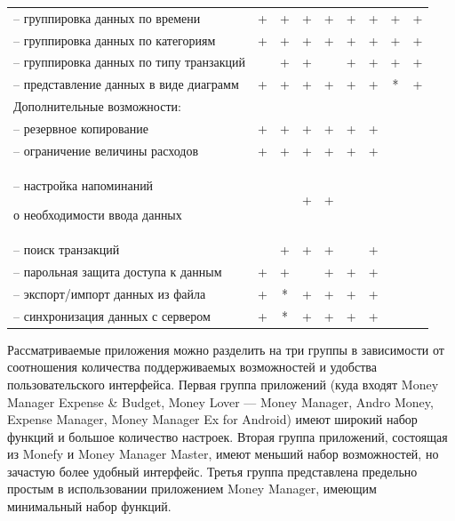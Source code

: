 \begin{table} [h]
{\begin{tabular}{| m{8cm} | c | c | c | c | c | c | c | c |}
      -- группировка данных по времени
      & +
      & +
      & +
      & +
      & +
      & +
      & +
      & + \\

      -- группировка данных по категориям
      & +
      & +
      & +
      & +
      & +
      & +
      & +
      & + \\

      -- группировка данных по типу транзакций
      &
      & +
      & +
      &
      & +
      & +
      & +
      & + \\

      -- представление данных в виде диаграмм
      & +
      & +
      & +
      & +
      & +
      & +
      & *
      & + \\

      \hline

      Дополнительные возможности:
      & & & & & & & & \\

      -- резервное копирование
      & +
      & +
      & +
      & +
      & +
      & +
      &
      & \\

      -- ограничение величины расходов
      & +
      & +
      & +
      & +
      & +
      & +
      &
      & \\
      \hline

      -- настройка напоминаний \par
      о необходимости ввода данных
      &
      &
      & +
      & +
      &
      &
      &
      & \\

      -- поиск транзакций
      &
      & +
      & +
      & +
      &
      & +
      &
      & \\

      -- парольная защита доступа к данным
      & +
      & +
      &
      & +
      & +
      & +
      &
      & \\

      -- экспорт/импорт данных из файла
      & +
      & *
      & +
      & +
      & +
      & +
      &
      & \\

      -- синхронизация данных с сервером
      & +
      & *
      & +
      & +
      & +
      & +
      &
      & \\
      \hline
    \end{tabular}
  }
\end{table}

Рассматриваемые приложения можно разделить на три группы в
зависимости от соотношения количества поддерживаемых
возможностей и удобства пользовательского интерфейса.
Первая группа приложений (куда входят Money Manager Expense \& Budget,
Money Lover --- Money Manager, Andro Money, Expense Manager,
Money Manager Ex for Android)
имеют широкий набор функций и большое количество настроек.
Вторая группа приложений, состоящая из Monefy и Money Manager Master,
имеют меньший набор возможностей, но зачастую более удобный интерфейс.
Третья группа представлена предельно простым в использовании приложением Money Manager,
имеющим минимальный набор функций.

